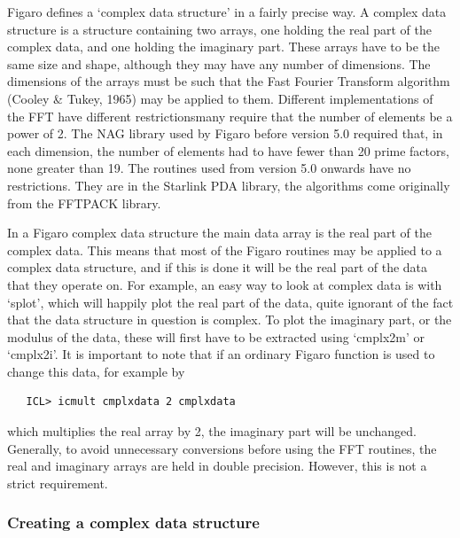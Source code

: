    Figaro defines a `complex data structure' in a fairly precise way. A
   complex data structure is a structure containing two arrays, one
   holding the real part of the complex data, and one holding the
   imaginary part. These arrays have to be the same size and shape,
   although they may have any number of dimensions.  The dimensions of
   the arrays must be such that the Fast Fourier Transform algorithm
   (Cooley \& Tukey, 1965) may be applied to them. Different
   implementations of the FFT have different restrictions\latorhtm{---}{-}many
   require
   that the number of elements be a power of 2. The NAG library used by
   Figaro before version 5.0 required that, in each dimension, the number of
   elements had to have fewer than 20 prime factors, none greater than 19.
   The routines used from version 5.0 onwards have no restrictions. They
   are in the Starlink PDA library, the algorithms come originally from
   the FFTPACK library.

   In a Figaro complex data structure the main data array is the real
   part of the complex data. This means that most of the Figaro routines
   may be applied to a complex data structure, and if this is done it
   will be the real part of the data that they operate on.  For example,
   an easy way to look at complex data is with `splot', which will
   happily plot the real part of the data, quite ignorant of the fact
   that the data structure in question is complex.  To plot the
   imaginary part, or the modulus of the data, these will first have to
   be extracted using `cmplx2m' or `cmplx2i'.  It is important to note
   that if an ordinary Figaro function is used to change this data, for
   example by

\begin{verbatim}
   ICL> icmult cmplxdata 2 cmplxdata
\end{verbatim}

   which multiplies the real array by 2, the imaginary part will be
   unchanged. Generally, to avoid unnecessary conversions before using
   the FFT routines, the real and imaginary arrays are held in
   double precision. However, this is not a strict requirement.


\subsubsection{\label{techno6create}Creating a complex data structure}

